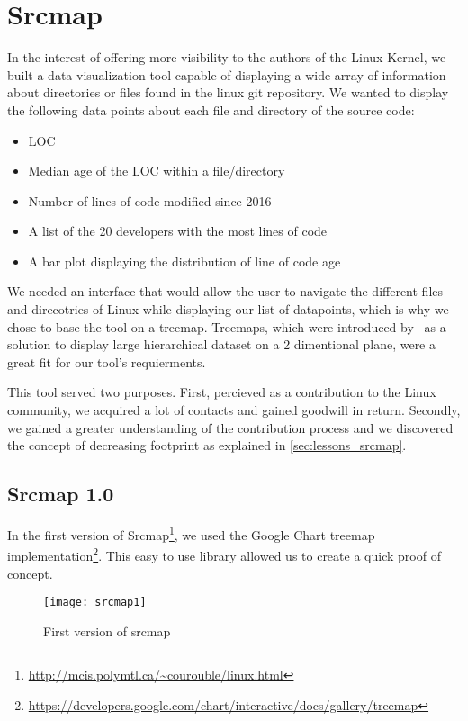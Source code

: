 \section{Srcmap}
\label{sec:srcmap}

In the interest of offering more visibility to the authors of the Linux Kernel, we built a data visualization tool capable of displaying a wide array of information about directories or files found in the linux git repository. We wanted to display the following data points about each file and directory of the source code:

\begin{itemize}
	\item \ac{LOC}
	\item Median age of the \ac{LOC} within a file/directory
	\item Number of lines of code modified since 2016
	\item A list of the 20 developers with the most lines of code
	\item A bar plot displaying the distribution of line of code age
\end{itemize}

We needed an interface that would allow the user to navigate the different files and direcotries of Linux while displaying our list of datapoints, which is why we chose to base the tool on a treemap. Treemaps, which were introduced by~\citep{Bederson-2002} as a solution to display large hierarchical dataset on a 2 dimentional plane, were a great fit for our tool's requierments. 

This tool served two purposes. First, percieved as a contribution to the Linux community, we acquired a lot of contacts and gained goodwill in return. Secondly, we gained a greater understanding of the contribution process and we discovered the concept of decreasing footprint as explained in \autoref{sec:lessons_srcmap}.

\subsection{Srcmap 1.0}

In the first version of Srcmap\footnote{\url{http://mcis.polymtl.ca/~courouble/linux.html}}, we used the Google Chart treemap implementation\footnote{\url{https://developers.google.com/chart/interactive/docs/gallery/treemap}}. This easy to use library allowed us to create a quick proof of concept. 

\begin{figure}[htb]
\centering
\texttt{[image: srcmap1]}
\caption{First version of srcmap}
\label{fig:srcmap1}
\end{figure}

